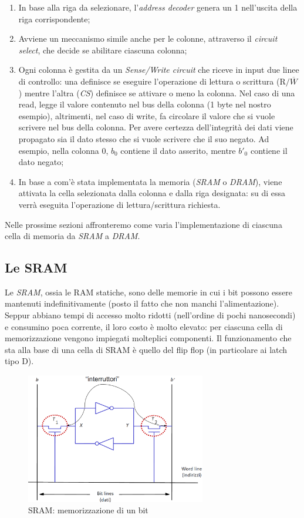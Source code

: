 \documentclass[class=book, crop=false, oneside]{standalone}
\begin{document}
\begin{enumerate}
	\item In base alla riga da selezionare, l'\emph{address decoder} genera un 1 nell'uscita della riga corrispondente;
	\item Avviene un meccanismo simile anche per le colonne, attraverso il \emph{circuit select}, che decide se abilitare ciascuna colonna;
	\item Ogni colonna è gestita da un \emph{Sense/Write circuit} che riceve in input due linee di controllo: una definisce se eseguire l'operazione di lettura o scrittura (\emph{\(\textrm{R/}\overline{W}\)}) mentre l'altra (\emph{CS}) definisce se attivare o meno la colonna. Nel caso di una read, legge il valore contenuto nel bus della colonna (1 byte nel nostro esempio), altrimenti, nel caso di write, fa circolare il valore che si vuole scrivere nel bus della colonna. Per avere certezza dell'integrità dei dati viene propagato sia il dato stesso che si vuole scrivere che il suo negato. Ad esempio, nella colonna 0, \(b_0\) contiene il dato asserito, mentre \(b'_0\) contiene il dato negato;
	\item In base a com'è stata implementata la memoria (\emph{SRAM} o \emph{DRAM}), viene attivata la cella selezionata dalla colonna e dalla riga designata: su di essa verrà eseguita l'operazione di lettura/scrittura richiesta.
\end{enumerate}

Nelle prossime sezioni affronteremo come varia l'implementazione di ciascuna cella di memoria da \emph{SRAM} a \emph{DRAM}.

\subsection{Le SRAM}
Le \emph{SRAM}, ossia le RAM statiche, sono delle memorie in cui i bit possono essere mantenuti indefinitivamente (posto il fatto che non manchi l'alimentazione). Seppur abbiano tempi di accesso molto ridotti (nell'ordine di pochi nanosecondi) e consumino poca corrente, il loro costo è molto elevato: per ciascuna cella di memorizzazione vengono impiegati molteplici componenti.
Il funzionamento che sta alla base di una cella di SRAM è quello del flip flop (in particolare ai latch tipo D).

\begin{figure}[H]
	\centering
	\includegraphics[width=0.7\textwidth,keepaspectratio]{cella_SRAM.png}
	\caption{SRAM: memorizzazione di un bit}
\end{figure}
\end{document}
